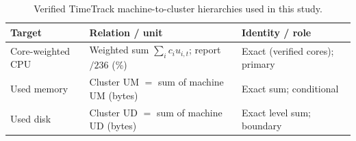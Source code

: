 \begin{table}[width=\columnwidth,pos=!t]
\centering
\caption{Verified TimeTrack machine-to-cluster hierarchies used in this study.}
\label{tab:hierarchies}
\begin{threeparttable}
\small
\begin{tabularx}{\tblwidth}{@{}l>{\raggedright\arraybackslash}X>{\raggedright\arraybackslash}X@{}}
\toprule
Target & Relation / unit & Identity / role \\
\midrule
Core-weighted {CPU}
  & Weighted sum $\sum_i c_i u_{i,t}$; report $/236$ (\%)
  & Exact (verified cores); primary \\
Used memory
  & Cluster {UM} $=$ sum of machine {UM} (bytes)
  & Exact sum; conditional \\
Used disk
  & Cluster {UD} $=$ sum of machine {UD} (bytes)
  & Exact level sum; boundary \\
\bottomrule
\end{tabularx}
\end{threeparttable}
\end{table}
